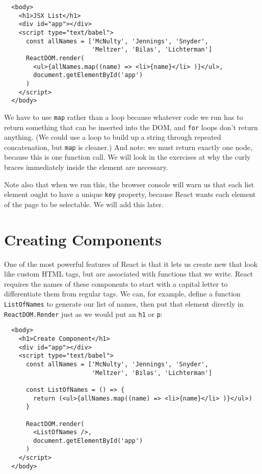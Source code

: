 \begin{verbatim}
  <body>
    <h1>JSX List</h1>
    <div id="app"></div>
    <script type="text/babel">
      const allNames = ['McNulty', 'Jennings', 'Snyder',
                        'Meltzer', 'Bilas', 'Lichterman']
      ReactDOM.render(
        <ul>{allNames.map((name) => <li>{name}</li> )}</ul>,
        document.getElementById('app')
      )
    </script>
  </body>
\end{verbatim}

We have to use \texttt{map} rather than a loop because whatever code we run has to return something
that can be inserted into the DOM,
and \texttt{for} loops don't return anything.
(We could use a loop to build up a string through repeated concatenation,
but \texttt{map} is cleaner.)
And note: we must return exactly one node,
because this is one function call.
We will look in the exercises at why the curly braces immediately inside the \texttt{} element are necessary.

Note also that when we run this,
the browser console will warn us that each list element ought to have a unique \texttt{key} property,
because React wants each element of the page to be selectable.
We will add this later.

\section{Creating Components}\label{s:dynamic-components}

One of the most powerful features of React is that it lets us create
new 
that look like custom HTML tags,
but are associated with functions that we write.
React requires the names of these components to start with a capital letter
to differentiate them from regular tags.
We can,
for example,
define a function \texttt{ListOfNames} to generate our list of names,
then put that element directly in \texttt{ReactDOM.Render}
just as we would put an \texttt{h1} or \texttt{p}:

\begin{verbatim}
  <body>
    <h1>Create Component</h1>
    <div id="app"></div>
    <script type="text/babel">
      const allNames = ['McNulty', 'Jennings', 'Snyder',
                        'Meltzer', 'Bilas', 'Lichterman']

      const ListOfNames = () => {
        return (<ul>{allNames.map((name) => <li>{name}</li> )}</ul>)
      }

      ReactDOM.render(
        <ListOfNames />,
        document.getElementById('app')
      )
    </script>
  </body>
\end{verbatim}

